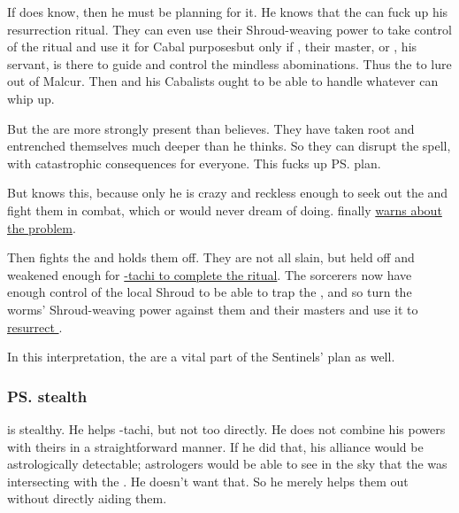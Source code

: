 \begin{garbage}
If \Secherdamon{} does know, then he must be planning for it. 
He knows that the \ghobaleth{} can fuck up his resurrection ritual. 
They can even use their Shroud-weaving power to take control of the ritual and use it for Cabal purposes\dash but only if \Teshrial, their master, or \Achsah, his servant, is there to guide and control the mindless abominations. 
Thus the  to lure \Achsah{} out of Malcur.
Then \LocarPsyrex{} and his Cabalists ought to be able to handle whatever \Teshrial{} can whip up. 

But the \ghobaleth{} are more strongly present than \Secherdamon{} believes. 
They have taken root and entrenched themselves much deeper than he thinks. 
So they can disrupt the spell, with catastrophic consequences for everyone. 
This fucks up \ps{\Secherdamon} plan. 

But \Ishnaruchaefir{} knows this, because only he is crazy and reckless enough to seek out the \ghobaleth{} and fight them in \melee{} combat, which \Secherdamon{} or \LocarPsyrex{} would never dream of doing. 
\Ishnaruchaefir{} finally \hyperref[Ishnaruchaefir tells Secherdamon of the Ghobaleth]{warns \Secherdamon{} about the problem}. 

Then \Ishnaruchaefir{} fights the \ghobaleth{} and holds them off. 
They are not all slain, but held off and weakened enough for \hyperref[Psyrex-tachi invoke the ritual]{\Psyrex-tachi to complete the ritual}. The sorcerers now have enough control of the local Shroud to be able to trap the \ghobaleth, and so turn the worms' Shroud-weaving power against them and their masters and use it to \hyperref[Nith'dornazsh rises]{resurrect \Nithdornazsh}. 

In this interpretation, the \ghobaleth{} are a vital part of the Sentinels' plan as well.






\subsubsection{\ps{\Ishnaruchaefir} stealth}
\Ishnaruchaefir{} is stealthy. 
He helps \Secherdamon-tachi, but not too directly. 
He does not combine his powers with theirs in a straightforward manner. 
If he did that, his alliance would be astrologically detectable; astrologers would be able to see in the sky that the  was intersecting with the . 
He doesn't want that. 
So he merely helps them out without directly aiding them. 


\end{garbage}
